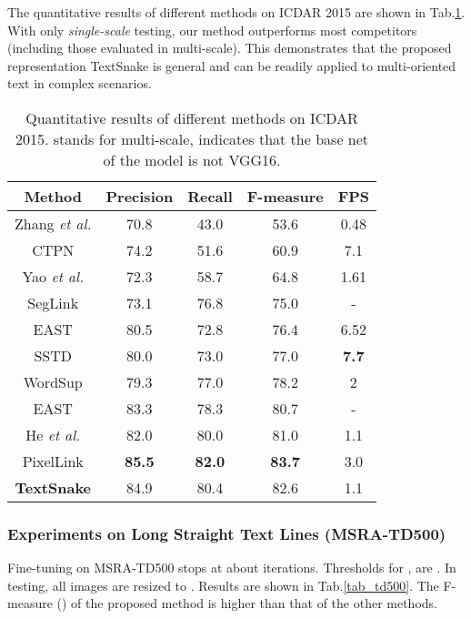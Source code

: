 \documentclass[runningheads]{llncs}
\begin{document}
The quantitative results of different methods on ICDAR 2015 are shown in Tab.\ref{tab_icdar2015}. 
With only \textit{single-scale} testing, our method outperforms most competitors (including those evaluated in multi-scale). 
This demonstrates that the proposed representation TextSnake is general and can be readily applied to multi-oriented text in complex scenarios.
\begin{table}
\small
\begin{centering}
\vspace{-2mm}
\caption{Quantitative results of different methods on ICDAR 2015.  stands for multi-scale,  indicates that the base net of the model is not VGG16.}  \label{tab_icdar2015}
\begin{tabular}{|c|c|c|c|c|}
\hline 
\textbf{Method} & \textbf{Precision} & \textbf{Recall} & \textbf{F-measure} & \textbf{FPS} \tabularnewline
\hline 
\hline 
Zhang \emph{et al.} \cite{zhang2016multi} & 70.8 & 43.0 & 53.6 & 0.48 \tabularnewline
\hline 
CTPN \cite{tian2016detecting} & 74.2  & 51.6  & 60.9 & 7.1 \tabularnewline
\hline 
Yao \emph{et al.} \cite{yao2016scene} & 72.3  & 58.7  & 64.8 & 1.61 \tabularnewline
\hline 
SegLink \cite{Shi_2017_CVPR} & 73.1  & 76.8 & 75.0 & - \tabularnewline
\hline 
EAST \cite{Zhou_2017_CVPR} & 80.5  & 72.8 & 76.4 & 6.52\tabularnewline
\hline 
SSTD \cite{SSTD} & 80.0  & 73.0 & 77.0 & \textbf{7.7} \tabularnewline
\hline
WordSup  \cite{Hu_2017_ICCV} & 79.3  & 77.0  & 78.2 & 2 \tabularnewline
\hline 
EAST   \cite{Zhou_2017_CVPR}& 83.3  & 78.3 & 80.7 & - \tabularnewline
\hline 
He \emph{et al.}   \cite{He_2017_ICCV} & 82.0  &  80.0 & 81.0 & 1.1 \tabularnewline
\hline
PixelLink \cite{deng2018pixellink} & \textbf{85.5}  & \textbf{82.0} & \textbf{83.7} & 3.0 \tabularnewline
\hline
\textbf{TextSnake} & 84.9 & 80.4 & 82.6 & 1.1\tabularnewline
\hline
\end{tabular}
\par\end{centering}
\vspace{-6mm}
\end{table}

\subsubsection*{Experiments on Long Straight Text Lines (MSRA-TD500)}

Fine-tuning on MSRA-TD500 stops at about  iterations. Thresholds for ,  are  . In testing, all images are resized to . Results are shown in Tab.\ref{tab_td500}. The F-measure () of the proposed method is higher than that of the other methods.
\end{document}
